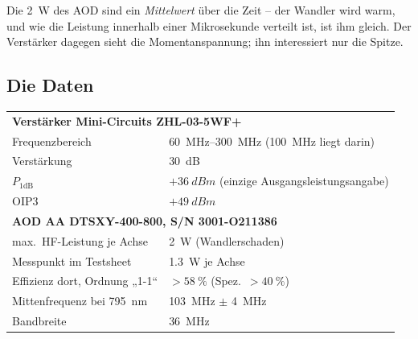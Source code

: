 \documentclass[11pt,a4paper]{article}
\begin{document}
Die \SI{2}{\watt} des AOD sind ein \emph{Mittelwert} über die Zeit -- der
Wandler wird warm, und wie die Leistung innerhalb einer Mikrosekunde verteilt
ist, ist ihm gleich. Der Verstärker dagegen sieht die Momentanspannung; ihn
interessiert nur die Spitze.

\subsection{Die Daten}

\begin{center}
\begin{tabular}{ll}
  \toprule
  \multicolumn{2}{l}{\textbf{Verstärker Mini-Circuits ZHL-03-5WF+}}\\
  Frequenzbereich & \SIrange{60}{300}{\mega\hertz} (\SI{100}{\mega\hertz} liegt darin)\\
  Verstärkung & \SI{30}{\deci\bel}\\
  $P_{1\mathrm{dB}}$ & $+\SI{36}{dBm}$ (einzige Ausgangsleistungsangabe)\\
  OIP3 & $+\SI{49}{dBm}$\\
  \midrule
  \multicolumn{2}{l}{\textbf{AOD AA DTSXY-400-800, S/N 3001-O211386}}\\
  max.\ HF-Leistung je Achse & \SI{2}{\watt} (Wandlerschaden)\\
  Messpunkt im Testsheet & \SI{1.3}{\watt} je Achse\\
  Effizienz dort, Ordnung „1-1`` & $>\SI{58}{\percent}$ (Spez.\ $>\SI{40}{\percent}$)\\
  Mittenfrequenz bei \SI{795}{\nano\meter} & \SI{103}{\mega\hertz} $\pm$ \SI{4}{\mega\hertz}\\
  Bandbreite & \SI{36}{\mega\hertz}\\
  \bottomrule
\end{tabular}
\end{center}
\end{document}
